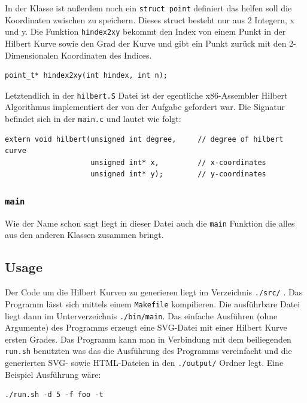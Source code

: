 \documentclass[course=erap]{aspdoc}
\begin{document}
In der Klasse ist außerdem noch ein \lstinline{struct point} definiert
das helfen soll die Koordinaten zwischen zu speichern. Dieses struct besteht nur
aus 2 Integern, x und y. \newline
Die Funktion \lstinline{hindex2xy} bekommt den Index von einem Punkt in der
Hilbert Kurve sowie den Grad der Kurve und gibt ein Punkt zurück mit den
2-Dimensionalen Koordinaten des Indices.
\begin{lstlisting}[caption={Signatur von hindex2xy},belowcaptionskip=0.6cm]
point_t* hindex2xy(int hindex, int n);
\end{lstlisting}
Letztendlich in der \lstinline{hilbert.S} Datei ist der egentliche
x86-Assembler Hilbert Algorithmus implementiert der von der Aufgabe gefordert
war. Die Signatur befindet sich in der \lstinline{main.c} und lautet wie folgt:

\begin{lstlisting}[caption={Signatur von hilbert},belowcaptionskip=0.6cm]
extern void hilbert(unsigned int degree,     // degree of hilbert curve
                    unsigned int* x,         // x-coordinates
                    unsigned int* y);        // y-coordinates
\end{lstlisting}

\subsubsection{\lstinline{main}}\label{main}
Wie der Name schon sagt liegt in dieser Datei auch die \lstinline{main}
Funktion die alles aus den anderen Klassen zusammen bringt.

\subsection{Usage}
Der Code um die Hilbert Kurven zu generieren liegt im Verzeichnis
\lstinline{./src/} . Das Programm lässt sich mittels einem \lstinline{Makefile}
kompilieren. Die ausführbare Datei liegt dann im Unterverzeichnis
\lstinline{./bin/main}. Das einfache Ausführen (ohne Argumente) des Programms
erzeugt eine SVG-Datei mit einer Hilbert Kurve ersten Grades. Das Programm
kann man in Verbindung mit dem beiliegenden \lstinline{run.sh} benutzten was das
die Ausführung des Programms vereinfacht und die generierten SVG- sowie
HTML-Dateien in den \lstinline{./output/} Ordner legt.
Eine Beispiel Ausführung wäre:

\begin{lstlisting}[numbers=none,caption=Beispiel Ausführung,belowcaptionskip=0.6cm]
./run.sh -d 5 -f foo -t
\end{lstlisting}
\end{document}
